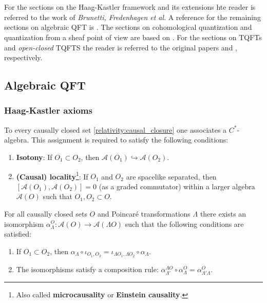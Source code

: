 \chapter{}

    For the sections on the Haag-Kastler framework and its extensions hte reader is referred to the work of \textit{Brunetti, Fredenhagen et al}. A reference for the remaining sections on algebraic QFT is \cite{baez_aqft}. The sections on cohomological quantization and quantization from a sheaf point of view are based on \cite{nuiten}. For the sections on TQFTs and \textit{open-closed} TQFTS the reader is referred to the original papers \cite{atiyah} and \cite{open_closed}, respectively.

\section{Algebraic QFT}
\subsection{Haag-Kastler axioms}

    \begin{axiom}\label{aqft:microcausality}
        To every causally closed set \ref{relativity:causal_closure} one associates a $C^*$-algebra. This assignment is required to satisfy the following conditions:
        \begin{enumerate}
            \item\textbf{Isotony}: If $O_1\subset O_2$, then $\mathcal{A}(O_1)\hookrightarrow\mathcal{A}(O_2)$.
            \item\textbf{(Causal) locality}\footnote{Also called \textbf{microcausality} or \textbf{Einstein causality}.}: If $O_1$ and $O_2$ are spacelike separated, then $[\mathcal{A}(O_1),\mathcal{A}(O_2)] = 0$ (as a graded commutator) within a larger algebra $\mathcal{A}(O)$ such that $O_1,O_2\subset O$.
        \end{enumerate}
    \end{axiom}

    \begin{axiom}
        For all causally closed sets $O$ and Poincar\'e transformations $\Lambda$ there exists an isomorphism $\alpha^O_\Lambda:\mathcal{A}(O)\rightarrow\mathcal{A}(\Lambda O)$ such that the following conditions are satisfied:
        \begin{enumerate}
            \item If $O_1\subset O_2$, then $\alpha_\Lambda\circ\iota_{O_1,O_2} = \iota_{\Lambda O_1,\Lambda O_2}\circ\alpha_\Lambda$.
            \item The isomorphisms satisfy a composition rule: $\alpha^{\Lambda O}_{\Lambda'}\circ\alpha^O_\Lambda = \alpha^O_{\Lambda'\Lambda}$.
        \end{enumerate}
    \end{axiom}


